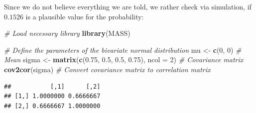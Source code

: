 \documentclass[
]{book}
\newenvironment{Shaded}{\begin{snugshade}}{\end{snugshade}}
\newcommand{\AttributeTok}[1]{\textcolor[rgb]{0.13,0.29,0.53}{#1}}
\newcommand{\CommentTok}[1]{\textcolor[rgb]{0.56,0.35,0.01}{\textit{#1}}}
\newcommand{\DecValTok}[1]{\textcolor[rgb]{0.00,0.00,0.81}{#1}}
\newcommand{\FloatTok}[1]{\textcolor[rgb]{0.00,0.00,0.81}{#1}}
\newcommand{\FunctionTok}[1]{\textcolor[rgb]{0.13,0.29,0.53}{\textbf{#1}}}
\newcommand{\NormalTok}[1]{#1}
\newcommand{\OtherTok}[1]{\textcolor[rgb]{0.56,0.35,0.01}{#1}}
\begin{document}
Since we do not believe everything we are told, we rather check via simulation,
if \(0.1526\) is a plausible value for the probability:

\begin{Shaded}
\begin{Highlighting}[]
\CommentTok{\# Load necessary library}
\FunctionTok{library}\NormalTok{(MASS)}

\CommentTok{\# Define the parameters of the bivariate normal distribution}
\NormalTok{mu }\OtherTok{\textless{}{-}} \FunctionTok{c}\NormalTok{(}\DecValTok{0}\NormalTok{, }\DecValTok{0}\NormalTok{)                       }\CommentTok{\# Mean}
\NormalTok{sigma }\OtherTok{\textless{}{-}} \FunctionTok{matrix}\NormalTok{(}\FunctionTok{c}\NormalTok{(}\FloatTok{0.75}\NormalTok{, }\FloatTok{0.5}\NormalTok{, }\FloatTok{0.5}\NormalTok{, }\FloatTok{0.75}\NormalTok{), }\AttributeTok{ncol =} \DecValTok{2}\NormalTok{) }\CommentTok{\# Covariance matrix}
\FunctionTok{cov2cor}\NormalTok{(sigma)  }\CommentTok{\# Convert covariance matrix to correlation matrix}
\end{Highlighting}
\end{Shaded}

\begin{verbatim}
##           [,1]      [,2]
## [1,] 1.0000000 0.6666667
## [2,] 0.6666667 1.0000000
\end{verbatim}
\end{document}
